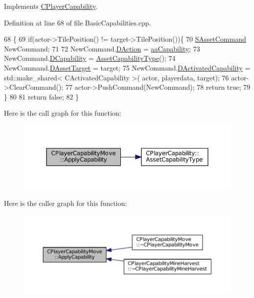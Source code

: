 Implements \hyperlink{classCPlayerCapability_a2ca6fd7fbd9c0178f1cf1d049c63825f}{C\+Player\+Capability}.



Definition at line 68 of file Basic\+Capabilities.\+cpp.


\begin{DoxyCode}
68                                                                                                            
                                                        \{
69     \textcolor{keywordflow}{if}(actor->TilePosition() != target->TilePosition())\{
70         \hyperlink{structSAssetCommand}{SAssetCommand} NewCommand;
71         
72         NewCommand.\hyperlink{structSAssetCommand_a8edd3b3d59a76d5514ba403bc8076a75}{DAction} = \hyperlink{GameDataTypes_8h_ab47668e651a3032cfb9c40ea2d60d670acf9fb164e8abd71c71f4a8c7fda360d4}{aaCapability};
73         NewCommand.\hyperlink{structSAssetCommand_a734ea7c6847457b437360f333f570ff9}{DCapability} = \hyperlink{classCPlayerCapability_a433bb196cd6ab6a932f1cac102b3aa98}{AssetCapabilityType}();
74         NewCommand.\hyperlink{structSAssetCommand_a3d9b43f6e59c386c48c41a65448a0c39}{DAssetTarget} = target;
75         NewCommand.\hyperlink{structSAssetCommand_ad8beda19520811cc70fe1eab16c774dd}{DActivatedCapability} = std::make\_shared< CActivatedCapability >(
      actor, playerdata, target);
76         actor->ClearCommand();
77         actor->PushCommand(NewCommand);
78         \textcolor{keywordflow}{return} \textcolor{keyword}{true};
79     \}
80 
81     \textcolor{keywordflow}{return} \textcolor{keyword}{false};
82 \}
\end{DoxyCode}
Here is the call graph for this function\+:
\nopagebreak
\begin{figure}[H]
\begin{center}
\leavevmode
\includegraphics[width=350pt]{classCPlayerCapabilityMove_ade3f4e72612cbf2ad73a6c2e6aa843df_cgraph}
\end{center}
\end{figure}
Here is the caller graph for this function\+:
\nopagebreak
\begin{figure}[H]
\begin{center}
\leavevmode
\includegraphics[width=350pt]{classCPlayerCapabilityMove_ade3f4e72612cbf2ad73a6c2e6aa843df_icgraph}
\end{center}
\end{figure}
